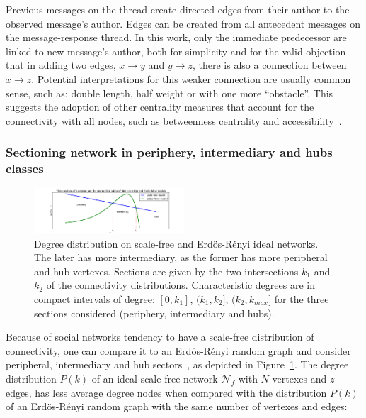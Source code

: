 \documentclass[%
 aip,
 jmp,%
 amsmath,amssymb,
 reprint,%
]{revtex4-1}
\begin{document}
Previous messages on the thread create directed edges from their author to the observed message's author. Edges can be created from all antecedent messages on the message-response thread. In this work, only the immediate predecessor are linked to new message's author, both for simplicity and for the valid objection that in adding two edges, $x\rightarrow y$ and $y\rightarrow z$, there is also a connection between $x\rightarrow z$. Potential interpretations for this weaker connection are usually common sense, such as: double length, half weight or with one more ``obstacle''. This suggests the adoption of other centrality measures that account for the connectivity with all nodes, such as betweenness centrality and accessibility~\cite{luMeasures,access}.


        \subsubsection{Sectioning network in periphery, intermediary and hubs classes}\label{sectioning}

\begin{figure}[hb]
    \centering
    \includegraphics[width=0.5\textwidth]{figs/fser}
    \caption{Degree distribution on scale-free and Erd\"os-R\'enyi ideal networks. The later has more
        intermediary, as the former has more peripheral and hub vertexes. Sections are
        given by the two intersections $k_1$ and $k_2$ of the connectivity distributions. Characteristic degrees
    are in compact intervals of degree: $[0,k_1]$, $(k_1,k_2]$, $(k_2,k_{max}]$ for the three sections considered (periphery, intermediary and hubs).}
    \label{fig:setores}
\end{figure}

Because of social networks tendency to have a scale-free distribution of connectivity,
one can compare it to an Erd\"os-R\'enyi random graph and consider peripheral, intermediary and hub
sectors~\cite{3setores}, as depicted in Figure~\ref{fig:setores}.
The degree distribution $\widetilde{P}(k)$ of an ideal
scale-free network $\mathcal{N}_f$ with $N$ vertexes and $z$ edges, has less
average degree nodes when compared with the distribution $P(k)$ of an Erd\"os-R\'enyi
random graph with the same number of vertexes and edges:
\end{document}

